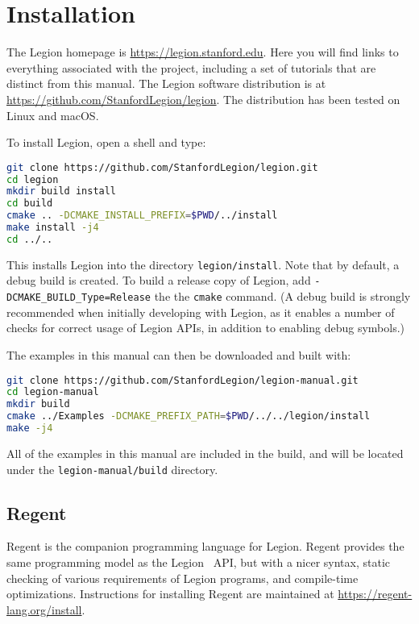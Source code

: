\chapter{Installation}
\label{chap:start}

The Legion homepage is \url{https://legion.stanford.edu}.  Here you will find
links to everything associated with the project, including a set of
tutorials that are distinct from this manual.  The Legion software distribution is at
\url{https://github.com/StanfordLegion/legion}.  The distribution has been
tested on Linux and macOS.

To install Legion, open a shell and type:

\begin{lstlisting}[language=bash,style=inline]
git clone https://github.com/StanfordLegion/legion.git
cd legion
mkdir build install
cd build
cmake .. -DCMAKE_INSTALL_PREFIX=$PWD/../install
make install -j4
cd ../..
\end{lstlisting}

This installs Legion into the directory
\lstinline{legion/install}. Note that by default, a debug build is
created. To build a release copy of Legion, add
\lstinline{-DCMAKE_BUILD_Type=Release} the the \lstinline{cmake}
command. (A debug build is strongly recommended when initially
developing with Legion, as it enables a number of checks for correct
usage of Legion APIs, in addition to enabling debug symbols.)

The examples in this manual can then be downloaded and built with:

\begin{lstlisting}[language=bash,style=inline]
git clone https://github.com/StanfordLegion/legion-manual.git
cd legion-manual
mkdir build
cmake ../Examples -DCMAKE_PREFIX_PATH=$PWD/../../legion/install
make -j4
\end{lstlisting}

All of the examples in this manual are included in the build, and will
be located under the \lstinline{legion-manual/build} directory.

\section{Regent}

Regent is the companion programming language for Legion.  Regent provides the same
programming model as the Legion \Cpp\ API, but with a nicer syntax, static checking
of various requirements of Legion programs, and compile-time optimizations.
Instructions for installing Regent are maintained at \url{https://regent-lang.org/install}.



